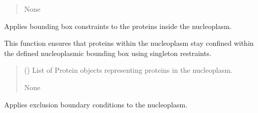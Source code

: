 \documentclass[letterpaper,10pt,english]{sphinxmanual}
\begin{document}
\begin{fulllineitems}
\begin{fulllineitems}
\begin{quote}
\begin{description}
\sphinxAtStartPar
None

\end{description}\end{quote}

\end{fulllineitems}


\begin{fulllineitems}
\label{\detokenize{src:src.System_Class.System.apply_nucleoplasm_box_boundary_conditions}}
\pysigstartsignatures
{}
\pysigstopsignatures
\sphinxAtStartPar
Applies bounding box constraints to the proteins inside the nucleoplasm.

\sphinxAtStartPar
This function ensures that proteins within the nucleoplasm stay confined
within the defined nucleoplasmic bounding box using singleton restraints.
\begin{quote}\begin{description}
\sphinxAtStartPar
{} () \textendash{} List of Protein objects representing proteins in the nucleoplasm.

\sphinxAtStartPar
None

\end{description}\end{quote}

\end{fulllineitems}


\begin{fulllineitems}
\label{\detokenize{src:src.System_Class.System.apply_nucleoplasm_excluded_boundary_conditions}}
\pysigstartsignatures
{}
\pysigstopsignatures
\sphinxAtStartPar
Applies exclusion boundary conditions to the nucleoplasm.


\end{fulllineitems}
\end{fulllineitems}
\end{document}
